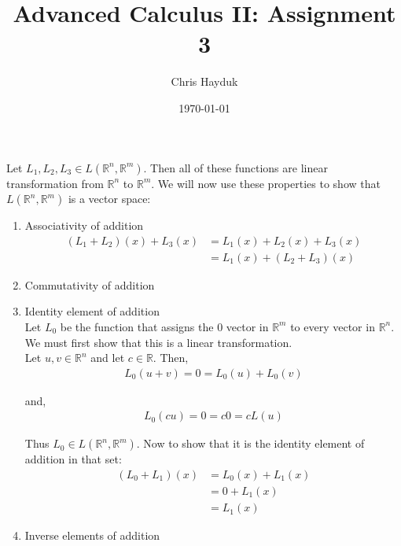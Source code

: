 \documentclass[12pt]{article}
\newenvironment{problem}[2][Problem]{\begin{trivlist}
\item[\hskip \labelsep {\bfseries #1}\hskip \labelsep {\bfseries #2.}]}{\end{trivlist}}
\begin{document}
\title{Advanced Calculus II: Assignment 3}

\author{Chris Hayduk}
\date{\today}

\maketitle

\begin{problem}{1}
\end{problem}

Let $L_1, L_2, L_3 \in L(\mathbb{R}^n, \mathbb{R}^m)$. Then all of these functions are linear transformation from $\mathbb{R}^n$ to $\mathbb{R}^m$. We will now use these properties to show that $L(\mathbb{R}^n, \mathbb{R}^m)$ is a vector space:

\begin{enumerate}

\item Associativity of addition
\begin{align*}
(L_1 + L_2)(x) + L_3(x) &= L_1(x) + L_2(x) + L_3(x)\\
&= L_1(x) + (L_2 + L_3)(x)
\end{align*}

\item Commutativity of addition

\item Identity element of addition\\

Let $L_0$ be the function that assigns the $0$ vector in $\mathbb{R}^m$ to every vector in $\mathbb{R}^n$. We must first show that this is a linear transformation.\\

Let $u, v \in \mathbb{R}^n$ and let $c \in \mathbb{R}$. Then,
\begin{align*}
L_0(u + v) = 0 = L_0(u) + L_0(v)
\end{align*}

and,
\begin{align*}
L_0(cu) = 0 = c0 = cL(u)
\end{align*}

Thus $L_0 \in L(\mathbb{R}^n, \mathbb{R}^m)$. Now to show that it is the identity element of addition in that set:
\begin{align*}
(L_0 + L_1)(x) &= L_0(x) + L_1(x)\\
&= 0 + L_1(x)\\
&= L_1(x)
\end{align*}

\item Inverse elements of addition

\end{enumerate}

\begin{problem}{2}
\end{problem}


\begin{problem}{3}
\end{problem}


\begin{problem}{4}
\end{problem}


\begin{problem}{5}
\end{problem}
\end{document}
